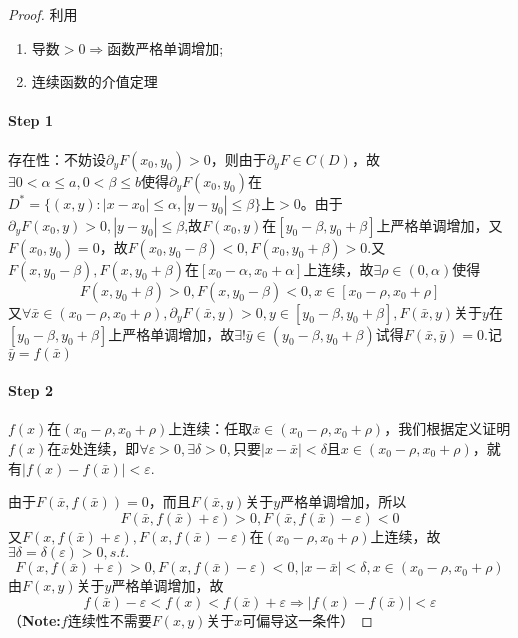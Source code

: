 \documentclass[UTF8]{ctexart}
\begin{document}
        \begin{proof}
            利用
            \begin{enumerate}
                \item 导数$>0\Rightarrow$函数严格单调增加;
                \item 连续函数的介值定理
            \end{enumerate}
            \paragraph{Step 1}存在性：不妨设$\partial_yF(x_0,y_0)>0$，则由于$\partial_yF\in C(D)$，故$\exists 0<\alpha\le a,0<\beta\le b$使得$\partial_yF(x_0,y_0)$在$D^*=\{(x,y):|x-x_0|\le \alpha,|y-y_0|\le \beta\}$上$>0$。由于$\partial_yF(x_0,y)>0,|y-y_0|\le\beta$,故$F(x_0,y)$在$[y_0-\beta,y_0+\beta]$上严格单调增加，又$F(x_0,y_0)=0$，故$F(x_0,y_0-\beta)<0,F(x_0,y_0+\beta)>0$.又$F(x,y_0-\beta),F(x,y_0+\beta)$在$[x_0-\alpha,x_0+\alpha]$上连续，故$\exists\rho\in(0,\alpha)$使得
            $$F(x,y_0+\beta)>0,F(x,y_0-\beta)<0,x\in[x_0-\rho,x_0+\rho]$$
            又$\forall\bar{x}\in(x_0-\rho,x_0+\rho),\partial_yF(\bar{x},y)>0,y\in[y_0-\beta,y_0+\beta],F(\bar{x},y)$关于$y$在$[y_0-\beta,y_0+\beta]$上严格单调增加，故$\exists!\bar{y}\in(y_0-\beta,y_0+\beta)$试得$F(\bar{x},\bar{y})=0$.记$\bar{y}=f(\bar{x})$

            \paragraph{Step 2}$f(x)$在$(x_0-\rho,x_0+\rho)$上连续：任取$\bar{x}\in(x_0-\rho,x_0+\rho)$，我们根据定义证明$f(x)$在$\bar{x}$处连续，即$\forall\varepsilon>0,\exists\delta>0,$只要$|x-\bar{x}|<\delta$且$x\in(x_0-\rho,x_0+\rho)$，就有$|f(x)-f(\bar{x})|<\varepsilon$.

            由于$F(\bar{x},f(\bar{x}))=0$，而且$F(\bar{x},y)$关于$y$严格单调增加，所以$$F(\bar{x},f(\bar{x})+\varepsilon)>0,F(\bar{x},f(\bar{x})-\varepsilon)<0$$
            又$F(x,f(\bar{x})+\varepsilon),F(x,f(\bar{x})-\varepsilon)$在$(x_0-\rho,x_0+\rho)$上连续，故$\exists\delta=\delta(\varepsilon)>0,s.t.$
            $$F(x,f(\bar{x})+\varepsilon)>0,F(x,f(\bar{x})-\varepsilon)<0,|x-\bar{x}|<\delta,x\in(x_0-\rho,x_0+\rho)$$
            由$F(x,y)$关于$y$严格单调增加，故
            $$f(\bar{x})-\varepsilon<f(x)<f(\bar{x})+\varepsilon\Rightarrow|f(x)-f(\bar{x})|<\varepsilon$$
            （\textbf{Note:}$f$连续性不需要$F(x,y)$关于$x$可偏导这一条件）


\end{proof}
\end{document}

